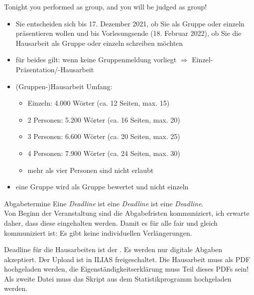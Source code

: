\documentclass[11pt]{beamer}
\begin{document}
\begin{frame}[t]{Tonight you performed as group, and you will be judged as group!}
	\begin{itemize}
		\item Sie entscheiden sich bis 17. Dezember 2021, ob Sie als Gruppe oder einzeln präsentieren wollen und bis Vorlesungsende (18. Februar 2022), ob Sie die Hausarbeit als Gruppe oder einzeln schreiben möchten
		\item für beides gilt: wenn keine Gruppenmeldung vorliegt $\Rightarrow$ Einzel-Präsentation/-Hausarbeit
		\item (Gruppen-)Hausarbeit Umfang:
			\begin{itemize}
				\item Einzeln: 4.000 Wörter (ca. 12 Seiten, max. 15)
				\item 2 Personen: 5.200 Wörter (ca. 16 Seiten, max. 20)
				\item 3 Personen: 6.600 Wörter (ca. 20 Seiten, max. 25)
				\item 4 Personen: 7.900 Wörter (ca. 24 Seiten, max. 30)
				\item mehr als vier Personen sind nicht erlaubt 
			\end{itemize}
		\item eine Gruppe wird als Gruppe bewertet und nicht einzeln
	\end{itemize}
\end{frame}

\begin{frame}[t]{Abgabetermine}
Eine \textit{Deadline} ist eine \textit{Deadline} ist eine \textit{Deadline}. \\

Von Beginn der Veranstaltung sind die Abgabefristen kommuniziert, ich erwarte daher, dass diese eingehalten werden. Damit es für alle fair und gleich kommuniziert ist: Es gibt keine individuellen Verlängerungen.

Deadline für die Hausarbeiten ist der . Es werden nur digitale Abgaben akzeptiert. Der Upload ist in ILIAS freigeschaltet. Die Hausarbeit muss als PDF hochgeladen werden, die Eigenständigkeitserklärung muss Teil dieses PDFs sein! Als zweite Datei muss das Skript aus dem Statistikprogramm hochgeladen werden. 

\end{frame}
\end{document}
